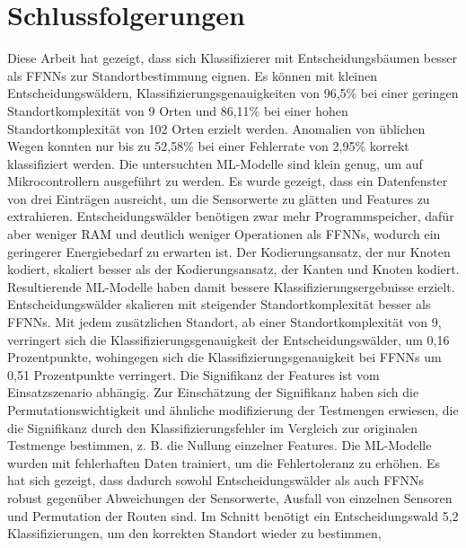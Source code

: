 \chapter{Schlussfolgerungen}
Diese Arbeit hat gezeigt, dass sich Klassifizierer mit Entscheidungsbäumen besser als FFNNs zur Standortbestimmung eignen.
Es können mit kleinen Entscheidungswäldern, Klassifizierungsgenauigkeiten von 96,5\% bei einer geringen Standortkomplexität von 9 Orten
und 86,11\% bei einer hohen Standortkomplexität von 102 Orten erzielt werden.
Anomalien von üblichen Wegen konnten nur bis zu 52,58\% bei einer Fehlerrate von 2,95\% korrekt klassifiziert werden.
\newline
\newline
Die untersuchten ML-Modelle sind klein genug, um auf Mikrocontrollern ausgeführt zu werden.
Es wurde gezeigt, dass ein Datenfenster von drei Einträgen ausreicht, um die Sensorwerte zu glätten und Features zu extrahieren.
Entscheidungswälder benötigen zwar mehr Programmspeicher, dafür aber weniger RAM und deutlich weniger Operationen als FFNNs, wodurch
ein geringerer Energiebedarf zu erwarten ist.
\newline
\newline
Der Kodierungsansatz, der nur Knoten kodiert, skaliert besser als der Kodierungsansatz, der Kanten und Knoten kodiert.
Resultierende ML-Modelle haben damit bessere Klassifizierungsergebnisse erzielt.
Entscheidungswälder skalieren mit steigender Standortkomplexität besser als FFNNs.
Mit jedem zusätzlichen Standort, ab einer Standortkomplexität von 9, verringert sich die Klassifizierungsgenauigkeit der Entscheidungswälder,
um 0,16 Prozentpunkte, wohingegen sich die Klassifizierungsgenauigkeit bei FFNNs um 0,51 Prozentpunkte verringert.
\newline
\newline
Die Signifikanz der Features ist vom Einsatzszenario abhängig.
Zur Einschätzung der Signifikanz haben sich die Permutationswichtigkeit \cite{breiman2001random} und ähnliche modifizierung der Testmengen erwiesen,
die die Signifikanz durch den Klassifizierungsfehler im Vergleich zur originalen Testmenge bestimmen, z. B. die Nullung einzelner Features.
\newpage
Die ML-Modelle wurden mit fehlerhaften Daten trainiert, um die Fehlertoleranz zu erhöhen.
Es hat sich gezeigt, dass dadurch sowohl Entscheidungswälder als auch FFNNs robust gegenüber Abweichungen der Sensorwerte,
Ausfall von einzelnen Sensoren und Permutation der Routen sind.
Im Schnitt benötigt ein Entscheidungswald 5,2 Klassifizierungen, um den korrekten Standort wieder zu bestimmen,
